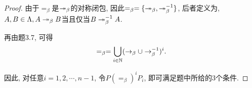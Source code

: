 \begin{proof}
    由于$=_\beta$是$\twoheadrightarrow_{\beta}$的对称闭包, 因此$=_\beta=\{\twoheadrightarrow_{\beta}, \twoheadrightarrow_{\beta}^{-1}\}$, 后者定义为, $A,B\in\Lambda, A\twoheadrightarrow_{\beta} B$当且仅当$B\twoheadrightarrow_{\beta}^{-1}A$.
	
	再由题3.7, 可得
	$$=_\beta=\bigcup_{i\in\mathbb{N}}(\rightarrow_{\beta}\cup\rightarrow_{\beta}^{-1})^i.$$
	
	因此, 对任意$i=1,2,\cdots, n-1$, 令$P(=_\beta)^iP_i$, 即可满足题中所给的3个条件.
\end{proof}